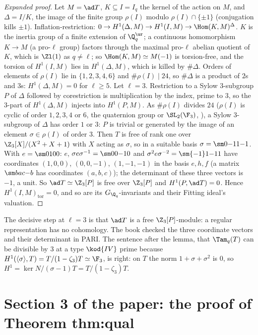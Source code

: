 \begin{sloppypar}
\begin{proof}[Expanded proof]
Let $M=\ad T$, $K\subseteq I=I_q$ the kernel of the action on $M$, and $\Delta=I/K$, the image of the finite group $\rho(I)$ modulo $\rho(I)\cap\{\pm1\}$ (conjugation kills $\pm1$).
Inflation-restriction: $0\to H^1(\Delta,M)\to H^1(I,M)\to\Hom(K,M)^\Delta$. $K$ is the inertia group of a finite extension of $\Q_q^{\ur}$; a continuous homomorphism $K\to M$ (a pro-$\ell$
group) factors through the maximal pro-$\ell$ abelian quotient of $K$, which is $\Zl(1)$ as $q\ne\ell$; so $\Hom(K,M)\simeq M(-1)$ is torsion-free, and the torsion of $H^1(I,M)$ lies in
$H^1(\Delta,M)$, which is killed by $\#\Delta$. Orders of elements of $\rho(I)$ lie in $\{1,2,3,4,6\}$ and $\#\rho(I)\mid24$, so $\#\Delta$ is a product of $2$s and $3$s: $H^1(\Delta,M)=0$ for
$\ell\ge5$. Let $\ell=3$. Restriction to a Sylow $3$-subgroup $P$ of $\Delta$ followed by corestriction is multiplication by the index, prime to $3$, so the $3$-part of
$H^1(\Delta,M)$ injects into $H^1(P,M)$. As $\#\rho(I)$ divides $24$ ($\rho(I)$ is cyclic of order $1,2,3,4$ or $6$, the quaternion group or $\SL_2(\F_3)$, ), a Sylow $3$-subgroup of $\Delta$ has
order $1$ or $3$: $P$ is trivial or generated by the image of an element $\sigma\in\rho(I)$ of order $3$. Then $T$ is free of rank one over $\Z_3[X]/(X^2+X+1)$
with $X$ acting as $\sigma$, so in a suitable basis $\sigma=\sm0{-1}1{-1}$. With $e=\sm0100$: $e$, $\sigma e\sigma^{-1}=\sm0{0}{-1}0$ and $\sigma^2e\sigma^{-2}=\sm{-1}1{-1}1$ have coordinates $(1,0,0)$,
$(0,0,-1)$, $(1,-1,-1)$ in the basis $e,h,f$ (a matrix $\sm b a c{-b}$ has coordinates $(a,b,c)$); the determinant of these three vectors is $-1$, a unit. So $\ad T\simeq\Z_3[P]$ is free over
$\Z_3[P]$ and $H^1(P,\ad T)=0$. Hence $H^1(I,M)_{\mathrm{tor}}=0$, and so are its $G_{\Q_q}$-invariants and their Fitting ideal's valuation.
\end{proof}

\noindent The decisive step at $\ell=3$ is that $\ad T$ is a free $\Z_3[P]$-module: a regular representation has no cohomology. The book checked the three
coordinate vectors and their determinant in PARI. The sentence after the lemma, that $\Tam_q(T)$ can be divisible by $3$ at a type $\kod{IV}$ prime because
$H^1(\langle\sigma\rangle,T)=T/(1-\zeta_3)T\simeq\F_3$, is right: on $T$ the norm $1+\sigma+\sigma^2$ is $0$, so $H^1=\ker N/(\sigma-1)T=T/(1-\zeta_3)T$.

\section[Paper 3: Theorem thm:qual]{Section 3 of the paper: the proof of Theorem thm:qual}\label{sec:paper:qual}


\end{sloppypar}
